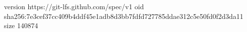 version https://git-lfs.github.com/spec/v1
oid sha256:7e3cef37cc409b4ddf45e1adb8d3bb7fdfd727785ddae312c5e50fd0f2d3da11
size 140874
